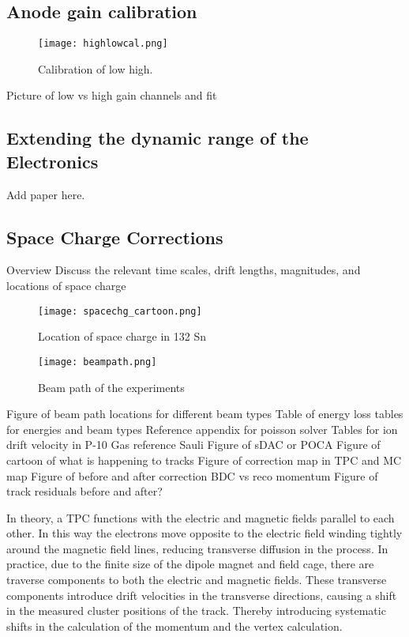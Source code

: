 \subsection{Anode gain calibration}

\begin{figure}[H]
\texttt{[image: highlowcal.png]}
\caption{Calibration of low high.}
\label{fig:highlowcal}
\end{figure}

Picture of low vs high gain channels and fit

\subsection{Extending the dynamic range of the Electronics}
Add paper here. 

\subsection{Space Charge Corrections}
Overview
Discuss the relevant time scales, drift lengths, magnitudes, and locations of space charge

\begin{figure}[H]
\texttt{[image: spacechg\_cartoon.png]}
\caption{Location of space charge in 132 Sn}
\label{fig:spacechg_cartoon}
\end{figure}

\begin{figure}[H]
\texttt{[image: beampath.png]}
\caption{Beam path of the experiments}
\label{fig:beampaths}
\end{figure}

Figure of beam path locations for different beam types
Table of energy loss tables for energies and beam types
Reference appendix for poisson solver 
Tables for ion drift velocity in P-10 Gas reference Sauli
Figure of sDAC or POCA 
Figure of cartoon of what is happening to tracks
Figure of correction map in TPC and MC map 
Figure of before and after correction BDC vs reco momentum
Figure of track residuals before and after?


In theory, a TPC functions with the electric and magnetic fields parallel to each other. In this way the electrons move opposite to the electric field winding tightly around the magnetic field lines, reducing transverse diffusion in the process. In practice, due to the finite size of the dipole magnet and field cage, there are traverse components to both the electric and magnetic fields. These transverse components introduce drift velocities in the transverse directions, causing a shift in the measured cluster positions of the track. Thereby introducing systematic shifts in the calculation of the momentum and the vertex calculation. 

